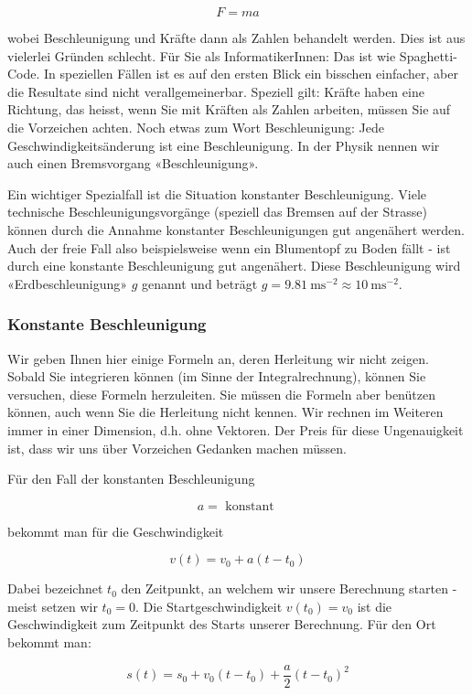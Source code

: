 $$
F=m a
$$

wobei Beschleunigung und Kräfte dann als Zahlen behandelt werden. Dies ist aus vielerlei Gründen schlecht. Für Sie als InformatikerInnen: Das ist wie Spaghetti-Code. In speziellen Fällen ist es auf den ersten Blick ein bisschen einfacher, aber die Resultate sind nicht verallgemeinerbar. Speziell gilt: Kräfte haben eine Richtung, das heisst, wenn Sie mit Kräften als Zahlen arbeiten, müssen Sie auf die Vorzeichen achten. Noch etwas zum Wort Beschleunigung: Jede Geschwindigkeitsänderung ist eine Beschleunigung. In der Physik nennen wir auch einen Bremsvorgang «Beschleunigung».

Ein wichtiger Spezialfall ist die Situation konstanter Beschleunigung. Viele technische Beschleunigungsvorgänge (speziell das Bremsen auf der Strasse) können durch die Annahme konstanter Beschleunigungen gut angenähert werden. Auch der freie Fall also beispielsweise wenn ein Blumentopf zu Boden fällt - ist durch eine konstante Beschleunigung gut angenähert. Diese Beschleunigung wird «Erdbeschleunigung» $g$ genannt und beträgt $g=9.81 \mathrm{~ms}^{-2} \approx 10 \mathrm{~ms}^{-2}$.

\subsubsection*{Konstante Beschleunigung}
Wir geben Ihnen hier einige Formeln an, deren Herleitung wir nicht zeigen. Sobald Sie integrieren können (im Sinne der Integralrechnung), können Sie versuchen, diese Formeln herzuleiten. Sie müssen die Formeln aber benützen können, auch wenn Sie die Herleitung nicht kennen. Wir rechnen im Weiteren immer in einer Dimension, d.h. ohne Vektoren. Der Preis für diese Ungenauigkeit ist, dass wir uns über Vorzeichen Gedanken machen müssen.

Für den Fall der konstanten Beschleunigung

$$
a=\text { konstant }
$$

bekommt man für die Geschwindigkeit

$$
v(t)=v_{0}+a\left(t-t_{0}\right)
$$

Dabei bezeichnet $t_{0}$ den Zeitpunkt, an welchem wir unsere Berechnung starten - meist setzen wir $t_{0}=0$. Die Startgeschwindigkeit $v\left(t_{0}\right)=v_{0}$ ist die Geschwindigkeit zum Zeitpunkt des Starts unserer Berechnung. Für den Ort bekommt man:

$$
s(t)=s_{0}+v_{0}\left(t-t_{0}\right)+\frac{a}{2}\left(t-t_{0}\right)^{2}
$$

